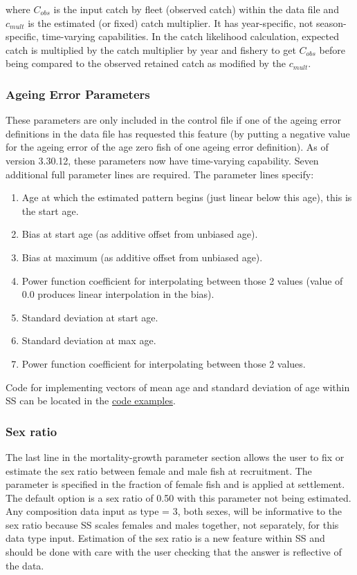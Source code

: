 where $C_{obs}$ is the input catch by fleet (observed catch) within the data file and $c_{mult}$ is the estimated (or fixed) catch multiplier. It has year-specific, not season-specific, time-varying capabilities.  In the catch likelihood calculation, expected catch is multiplied by the catch multiplier by year and fishery to get $C_{obs}$ before being compared to the observed retained catch as modified by the $c_{mult}$.  

\subsubsection{Ageing Error Parameters}
These parameters are only included in the control file if one of the ageing error definitions in the data file has requested this feature (by putting a negative value for the ageing error of the age zero fish of one ageing error definition). As of version 3.30.12, these parameters now have time-varying capability. Seven additional full parameter lines are required. The parameter lines specify:
\begin{enumerate}
	\item Age at which the estimated pattern begins (just linear below this age), this is the start age.
	\item Bias at start age (as additive offset from unbiased age).
	\item Bias at maximum (as additive offset from unbiased age).
	\item Power function coefficient for interpolating between those 2 values (value of 0.0 produces linear interpolation in the bias).
	\item Standard deviation at start age.
	\item Standard deviation at max age.
	\item Power function coefficient for interpolating between those 2 values.
\end{enumerate}

\noindent Code for implementing vectors of mean age and standard deviation of age within SS can be located in the \hyperlink{AgeingError}{code examples}.

\subsubsection{Sex ratio}
The last line in the mortality-growth parameter section allows the user to fix or estimate the sex ratio between female and male fish at recruitment.  The parameter is specified in the fraction of female fish and is applied at settlement. The default option is a sex ratio of 0.50 with this parameter not being estimated.  Any composition data input as type = 3, both sexes, will be informative to the sex ratio because SS scales females and males together, not separately, for this data type input. Estimation of the sex ratio is a new feature within SS and should be done with care with the user checking that the answer is reflective of the data.

